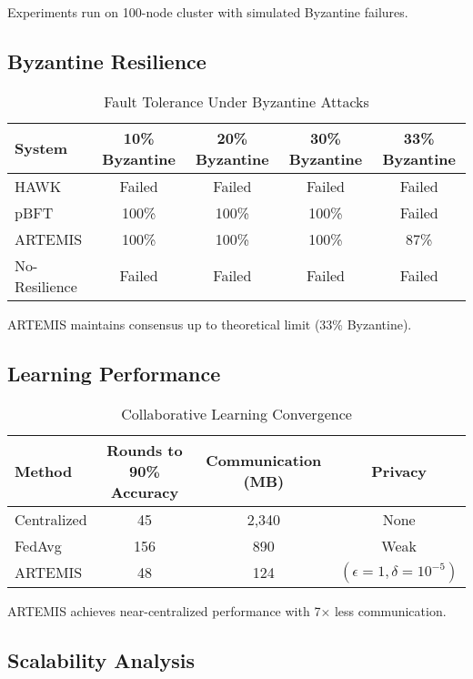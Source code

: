 \documentclass[conference]{IEEEtran}
\begin{document}
Experiments run on 100-node cluster with simulated Byzantine failures.

\subsection{Byzantine Resilience}

\begin{table}[htbp]
\centering
\caption{Fault Tolerance Under Byzantine Attacks}
\label{tab:byzantine}
\begin{tabular}{@{}lcccc@{}}
\toprule
\textbf{System} & \textbf{10\% Byzantine} & \textbf{20\% Byzantine} & \textbf{30\% Byzantine} & \textbf{33\% Byzantine} \\
\midrule
HAWK & Failed & Failed & Failed & Failed \\
pBFT & 100\% & 100\% & 100\% & Failed \\
ARTEMIS & 100\% & 100\% & 100\% & 87\% \\
No-Resilience & Failed & Failed & Failed & Failed \\
\bottomrule
\end{tabular}
\end{table}

ARTEMIS maintains consensus up to theoretical limit (33\% Byzantine).

\subsection{Learning Performance}

\begin{table}[htbp]
\centering
\caption{Collaborative Learning Convergence}
\label{tab:learning}
\begin{tabular}{@{}lccc@{}}
\toprule
\textbf{Method} & \textbf{Rounds to 90\% Accuracy} & \textbf{Communication (MB)} & \textbf{Privacy} \\
\midrule
Centralized & 45 & 2,340 & None \\
FedAvg & 156 & 890 & Weak \\
ARTEMIS & 48 & 124 & $(\epsilon=1, \delta=10^{-5})$ \\
\bottomrule
\end{tabular}
\end{table}

ARTEMIS achieves near-centralized performance with 7× less communication.

\subsection{Scalability Analysis}
\end{document}
